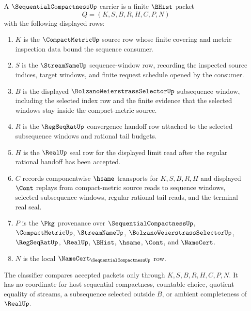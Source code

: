 \begin{definition}
\label{def:sequential-compactness-carrier}
A $\SequentialCompactnessUp$ carrier is a finite $\BHist$ packet
$$
Q=(K,S,B,R,H,C,P,N)
$$
with the following displayed rows:
\begin{enumerate}
\item $K$ is the $\CompactMetricUp$ source row whose finite covering and metric inspection data bound the sequence consumer.
\item $S$ is the $\StreamNameUp$ sequence-window row, recording the inspected source indices, target windows, and finite request schedule opened by the consumer.
\item $B$ is the displayed $\BolzanoWeierstrassSelectorUp$ subsequence window, including the selected index row and the finite evidence that the selected windows stay inside the compact-metric source.
\item $R$ is the $\RegSeqRatUp$ convergence handoff row attached to the selected subsequence windows and rational tail budgets.
\item $H$ is the $\RealUp$ seal row for the displayed limit read after the regular rational handoff has been accepted.
\item $C$ records componentwise $\hsame$ transports for $K,S,B,R,H$ and displayed $\Cont$ replays from compact-metric source reads to sequence windows, selected subsequence windows, regular rational tail reads, and the terminal real seal.
\item $P$ is the $\Pkg$ provenance over $\SequentialCompactnessUp$, $\CompactMetricUp$, $\StreamNameUp$, $\BolzanoWeierstrassSelectorUp$, $\RegSeqRatUp$, $\RealUp$, $\BHist$, $\hsame$, $\Cont$, and $\NameCert$.
\item $N$ is the local $\NameCert_{\SequentialCompactnessUp}$ row.
\end{enumerate}
The classifier compares accepted packets only through $K,S,B,R,H,C,P,N$. It has no coordinate for host sequential compactness, countable choice, quotient equality of streams, a subsequence selected outside $B$, or ambient completeness of $\RealUp$.
\end{definition}

